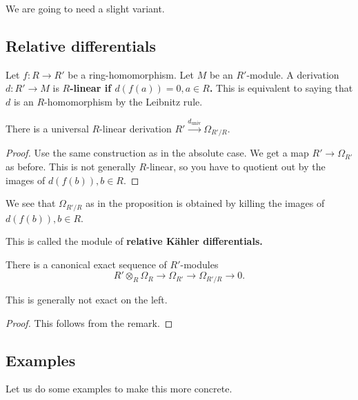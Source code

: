 We are going to need a slight variant.

\subsection{Relative differentials}
\begin{definition} 
Let $f: R \to R'$ be a ring-homomorphism. Let $M$ be an $R'$-module. A
derivation $d: R' \to M$ is \textbf{$R$-linear if $d(f(a)) = 0, a \in R$.}
This is equivalent to saying that $d$ is an $R$-homomorphism by the Leibnitz
rule.
\end{definition} 

\begin{proposition} 
There is a universal $R$-linear derivation $R'
\stackrel{d_{\mathrm{univ}}}{\to} \Omega_{R'/R}$.
\end{proposition} 
\begin{proof} 
Use the same construction as in the absolute case. We get a map $R' \to
\Omega_{R'}$ as before. This is not generally $R$-linear, so you have to
quotient out by the images of $d(f(b)), b \in R$.
\end{proof} 

\begin{remark} 
We see that $\Omega_{R'/R}$ as in the proposition is obtained by killing the
images of $d(f(b)), b \in R$. 
\end{remark} 

\begin{definition} 
This is called the module of \textbf{relative K\"ahler differentials.}
\end{definition} 

\begin{theorem} 
There is a canonical exact sequence of $R'$-modules
\[ R' \otimes_R \Omega_R \to \Omega_{R'} \to \Omega_{R'/R} \to 0.  \]
\end{theorem} 
This is generally not exact on the left.
\begin{proof} 
This follows from the remark. 
\end{proof} 

\subsection{Examples} Let us do some examples to make this more concrete.

